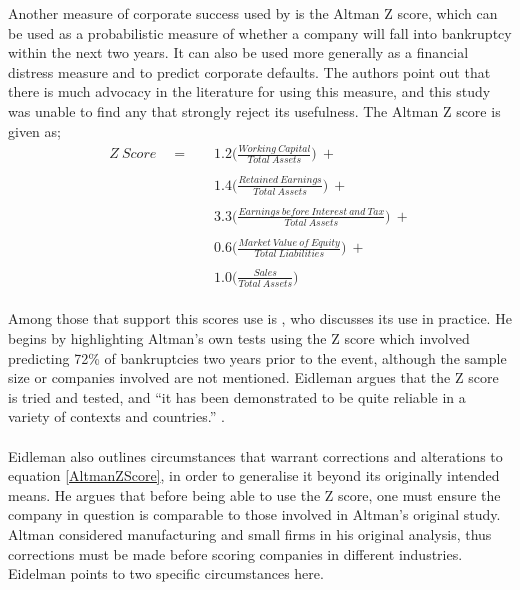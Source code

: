 {Another measure of corporate success used by \cite{moldovan2015learning} is the Altman Z score, which can be used as a probabilistic measure of whether a company will fall into bankruptcy within the next two years. It can also be used more generally as a financial distress measure and to predict corporate defaults. The authors point out that there is much advocacy in the literature for using this measure, and this study was unable to find any that strongly reject its usefulness. The Altman Z score is given as;
\begin {equation}\label{AltmanZScore}
\begin{aligned}
Z \ Score \quad = \quad & 1.2\bigg(\frac{Working \ Capital}{Total \ Assets}\bigg) \ + \\\\
		& 1.4\bigg({\frac{Retained \ Earnings}{Total \ Assets}}\bigg) \ + \\\\
		& 3.3\bigg({\frac{Earnings \ before \ Interest \ and \ Tax}{Total \ Assets}}\bigg) \ + \\\\
		& 0.6\bigg({\frac{Market \ Value \ of \ Equity}{Total \ Liabilities}}\bigg) \ + \\\\
		& 1.0\bigg({\frac{Sales}{Total \ Assets}}\bigg)
\end{aligned}
\end{equation}\\
Among those that support this scores use is \cite {eidleman1995z}, who discusses its use in practice. He begins by highlighting Altman's own tests using the Z score which involved predicting 72\% of bankruptcies two years prior to the event, although the sample size or companies involved are not mentioned. Eidleman argues that the Z score is tried and tested, and ``it has been demonstrated to be quite reliable in a variety of contexts and countries.'' \cite {eidleman1995z}. \\\\
Eidleman also outlines circumstances that warrant corrections and alterations to equation \ref{AltmanZScore}, in order to generalise it beyond its originally intended means. He argues that before being able to use the Z score, one must ensure the company in question is comparable to those involved in Altman's original study. Altman considered manufacturing and small firms in his original analysis, thus corrections must be made before scoring companies in different industries. Eidelman points to two specific circumstances here. \\\\
}
